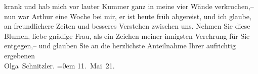 \begin{ledgroupsized}[t]{13cm}
               krank und hab mich vor lauter Kummer ganz in meine vier Wände verkrochen,– nun war
                  Arthur eine Woche bei mir, er ist heute früh
               abgereist, und ich glaube, an freundlichere Zeiten und besseres Verstehen zwischen
               uns.\pend
           \pstart
           Nehmen Sie diese Blumen, liebe gnädige Frau, als ein Zeichen meiner innigsten
               Verehrung für Sie entgegen,– und glauben Sie an die herzlichste Anteilnahme{\pb}\pend
           \pstart
           Ihrer aufrichtig ergebenen{\\[\baselineskip]}\spacefill\mbox{Olga Schnitzler.}\pend
           \leftskip=0em{}\pstart
           \noindent{}11. Mai 21. \pend
           \endnumbering{}\end{ledgroupsized}  \newcommand{\dateiname}{L02367}\newcommand{\titel}{Olga Schnitzler an Anna Bahr-Mildenburg, 11. 5. 1921}\newcommand{\editorInnen}{ Martin Anton Müller und Gerd-Hermann Susen}
      